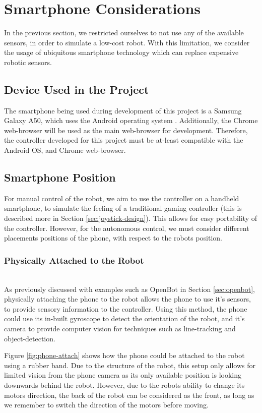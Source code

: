 \documentclass{l4proj}
\begin{document}
\section{Smartphone Considerations}
In the previous section, we restricted ourselves to not use any of the available sensors, in order to simulate a low-cost robot. With this limitation, we consider the usage of ubiquitous smartphone technology which can replace expensive robotic sensors.

\subsection{Device Used in the Project}
The smartphone being used during development of this project is a Samsung Galaxy A50, which uses the Android operating system \citep{phonespec}. Additionally, the Chrome web-browser will be used as the main web-browser for development. Therefore, the controller developed for this project must be at-least compatible with the Android OS, and Chrome web-browser.

\subsection{Smartphone Position}
For manual control of the robot, we aim to use the controller on a handheld smartphone, to simulate the feeling of a traditional gaming controller (this is described more in Section \ref{sec:joystick-design}). This allows for easy portability of the controller. However, for the autonomous control, we must consider different placements positions of the phone, with respect to the robots position.

\subsubsection{Physically Attached to the Robot} \hfill \\
As previously discussed with examples such as OpenBot in Section \ref{sec:openbot}, physically attaching the phone to the robot allows the phone to use it's sensors, to provide sensory information to the controller. Using this method, the phone could use its in-built gyroscope to detect the orientation of the robot, and it's camera to provide computer vision for techniques such as line-tracking and object-detection. 

Figure \ref{fig:phone-attach} shows how the phone could be attached to the robot using a rubber band. Due to the structure of the robot, this setup only allows for limited vision from the phone camera as its only available position is looking downwards behind the robot. However, due to the robots ability to change its motors direction, the back of the robot can be considered as the front, as long as we remember to switch the direction of the motors before moving.
\end{document}
